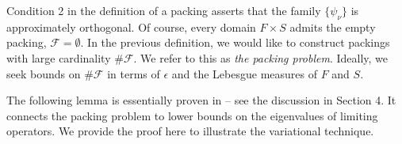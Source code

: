 \documentclass[conference]{IEEEtran}
\def\R{\mathbb{R}}
\numberwithin{equation}{section}
\newcommand{\AM}[1]{{\color{purple}AM: #1}}
\newcommand{\cF}{\mathcal F}
\def\R{\mathbb{R}}
\begin{document}
Condition 2 in the definition of a packing asserts that the family $\{\psi_\nu\}$ is approximately orthogonal.
Of course, every domain $F \times S$ admits the empty packing, 
 $\mathcal{F} = \emptyset$. In the previous definition, we would like to construct packings with large cardinality $\#\cF$. We refer to this as {\it the packing problem}. Ideally, we seek bounds on $\# \cF $  in terms of $\epsilon$ and the Lebesgue measures of $F$ and $S$.



The following lemma is essentially proven in \cite{Kulikov24} -- see the discussion in Section 4. It connects the packing problem to lower bounds on the eigenvalues of limiting operators. We provide the proof here to illustrate the variational technique.
\end{document}
